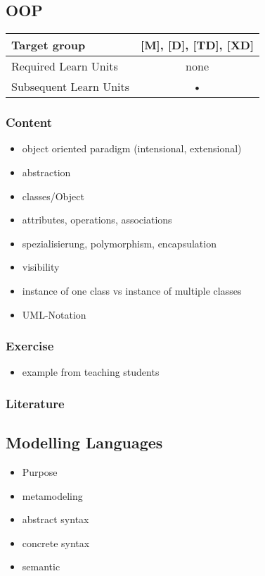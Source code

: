 \documentclass[10pt,a4paper]{report}
\begin{document}
\subsection{OOP}
\label{sub:OOP}

\begin{tabular}{|l|c|}
\hline 
Target group & [M], [D], [TD], [XD] \\ 
\hline 
Required Learn Units & none \\ 
\hline 
Subsequent Learn Units & • \\ 
\hline 
\end{tabular} 

\subsubsection*{Content}

\begin{itemize}
\item object oriented paradigm (intensional, extensional)
\item abstraction
\item classes/Object
\item attributes, operations, associations
\item spezialisierung, polymorphism, encapsulation
\item visibility
\item instance of one class vs instance of multiple classes
\item UML-Notation
\end{itemize}

\subsubsection*{Exercise}
\begin{itemize}
\item example from teaching students
\end{itemize}

\subsubsection*{Literature}

\subsection{Modelling Languages}
\label{sub:Modelling Languages}
\begin{itemize}
\item Purpose
\item metamodeling
\item abstract syntax
\item concrete syntax
\item semantic
\end{itemize}
\end{document}
